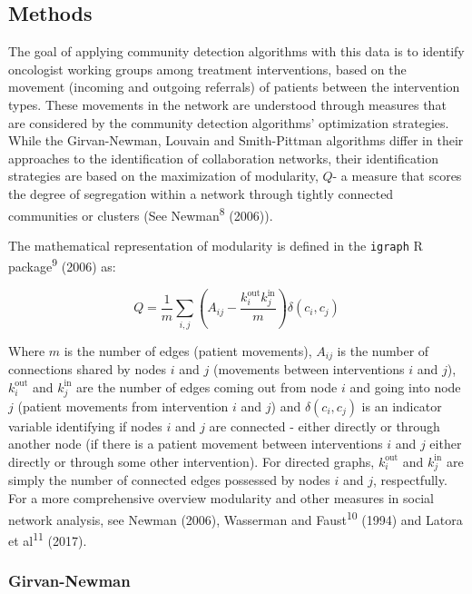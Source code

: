 \documentclass{article}
\begin{document}
\subsection{Methods}\label{methods}

The goal of applying community detection algorithms with this data is to
identify oncologist working groups among treatment interventions, based on the movement
(incoming and outgoing referrals) of patients between the intervention types. These
movements in the network are understood through measures that are
considered by the community detection algorithms' optimization
strategies. While the Girvan-Newman, Louvain and Smith-Pittman
algorithms differ in their approaches to the identification of collaboration
networks, their identification strategies are based on the maximization of
modularity, \(Q\)- a measure that scores the degree of segregation
within a network through tightly connected communities or clusters (See
Newman\textsuperscript{8} (2006)).

The mathematical representation of modularity is defined in the
\texttt{igraph} R package\textsuperscript{9} (2006) as:

\[Q = \frac{1}{m}\sum_{i,j}^{}\left( A_{ij} - \frac{k_{i}^{\text{out}}k_{j}^{\text{in}}}{m} \right)\delta\left( c_{i},c_{j} \right)\]

Where \(m\) is the number of edges (patient movements), \(A_{ij}\) is
the number of connections shared by nodes \(i\) and \(j\) (movements
between interventions \(i\) and \(j\)), \(k_{i}^{\text{out}}\) and
\(k_{j}^{\text{in}}\) are the number of edges coming out from node \(i\)
and going into node \(j\) (patient movements from intervention \(i\) and
\(j\)) and \(\delta\left( c_{i},c_{j} \right)\) is an indicator variable
identifying if nodes \(i\) and \(j\) are connected - either directly or
through another node (if there is a patient movement between
interventions \(i\) and \(j\) either directly or through some other
intervention). For directed graphs, \(k_{i}^{\text{out}}\) and
\(k_{j}^{\text{in}}\) are simply the number of connected edges possessed
by nodes \(i\) and \(j\), respectfully. For a more comprehensive overview
modularity and other measures in social network analysis, see Newman
(2006), Wasserman and Faust\textsuperscript{10} (1994) and Latora et
al\textsuperscript{11} (2017).

\subsubsection{Girvan-Newman}\label{girvan-newman}
\end{document}
